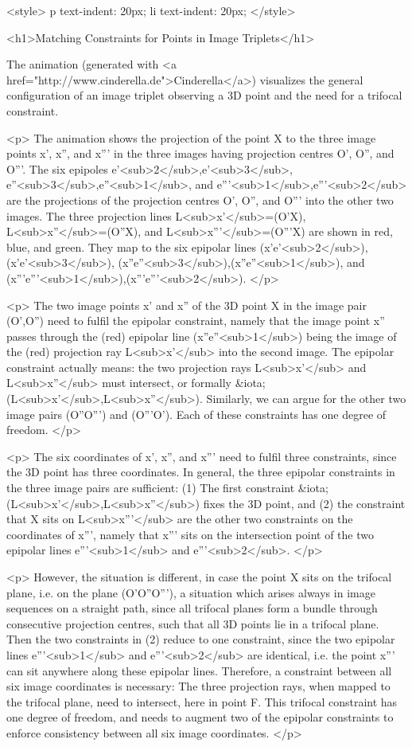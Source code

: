 <style>
p {
  text-indent: 20px;
}
li {
  text-indent: 20px;
}
</style>

<h1>Matching Constraints for Points in Image Triplets</h1> 


The animation (generated with  <a href="http://www.cinderella.de">Cinderella</a>) visualizes the general configuration of an image triplet observing a 3D point and the need for a trifocal constraint. 

<p> The animation shows the projection of the point X to the three image points x', x'', and x''' in the three images having projection centres O', O'', and O'''. The six epipoles {e'<sub>2</sub>,e'<sub>3</sub>},  {e''<sub>3</sub>,e''<sub>1</sub>}, and {e'''<sub>1</sub>,e'''<sub>2</sub>} are the projections of the projection centres O', O'', and O''' into the other two images. The three projection lines L<sub>x'</sub>=(O'X), L<sub>x''</sub>=(O''X), and L<sub>x'''</sub>=(O'''X) are shown in red, blue, and green. They map to the six epipolar lines {(x'e'<sub>2</sub>),(x'e'<sub>3</sub>)},  {(x''e''<sub>3</sub>),(x''e''<sub>1</sub>)}, and {(x'''e'''<sub>1</sub>),(x'''e'''<sub>2</sub>)}.   </p>
    
<p> The two image points x' and x'' of the 3D point X in the image pair (O',O'') need to fulfil the epipolar constraint, namely that the image point x'' passes through the (red) epipolar line (x''e''<sub>1</sub>) being the image of the (red) projection ray L<sub>x'</sub> into the second image. The epipolar constraint actually means: the two projection rays L<sub>x'</sub> and L<sub>x''</sub> must intersect, or formally  &iota;(L<sub>x'</sub>,L<sub>x''</sub>). Similarly, we can argue for the other two image pairs (O''O''') and (O'''O'). Each of these constraints has one degree of freedom. 
</p>

<p> The six coordinates of x', x'', and x''' need to fulfil three constraints, since the 3D point has three coordinates. In general, the three epipolar constraints in the three image pairs are sufficient: (1) The first constraint 
&iota;(L<sub>x'</sub>,L<sub>x''</sub>) fixes the 3D point, and (2) the constraint that X sits on L<sub>x'''</sub> are the other two constraints on the coordinates of x''', namely that x''' sits on the intersection point of the two epipolar lines e'''<sub>1</sub> and e'''<sub>2</sub>. </p>

<p> However, the situation is different, in case the point X sits on the trifocal plane, i.e. on the plane (O'O''O'''), a situation which arises always in image sequences on a straight path, since all trifocal planes form a bundle through consecutive projection centres, such that all 3D points lie in a trifocal plane.  Then the two constraints in (2) reduce to one constraint, since the two epipolar lines e'''<sub>1</sub> and e'''<sub>2</sub> are identical, i.e. the point x''' can sit anywhere along these epipolar lines. Therefore, a constraint between all six image coordinates is necessary: The three projection rays, when mapped to the trifocal plane, need to intersect, here in point F. This trifocal constraint has one degree of freedom, and needs to augment two of the epipolar constraints to enforce consistency between all six image coordinates. </p>


